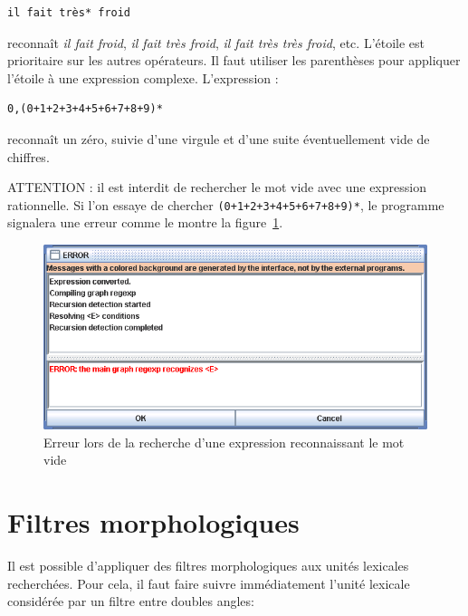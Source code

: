 \begin{verbatim}
il fait très* froid
\end{verbatim}

\noindent reconnaît \textit{il fait froid}, \textit{il fait très froid},
\textit{il fait très très froid}, etc. L’étoile est prioritaire sur les
autres opérateurs. Il faut utiliser les parenthèses pour appliquer l’étoile à une expression
complexe. L’expression :


\begin{verbatim}
0,(0+1+2+3+4+5+6+7+8+9)*
\end{verbatim}

\noindent reconnaît un zéro, suivie d’une virgule et d’une suite éventuellement vide de chiffres.

\bigskip
\noindent ATTENTION : il est interdit de rechercher le mot vide avec une expression rationnelle.
Si l’on essaye de chercher \verb$(0+1+2+3+4+5+6+7+8+9)*$, le programme signalera une erreur
comme le montre la figure~\ref{fig-epsilon-error}.


\bigskip
\begin{figure}[h]
\begin{center}
\includegraphics[width=14cm]{resources/img/fig4-3.png}
\caption{Erreur lors de la recherche d’une expression reconnaissant le mot vide \label{fig-epsilon-error}}
\end{center}
\end{figure}


\section{Filtres morphologiques}
\label{section-filters}

Il est possible d’appliquer des filtres morphologiques aux unités lexicales recherchées.
Pour cela, il faut faire suivre immédiatement l’unité lexicale considérée par un filtre entre
doubles angles:



